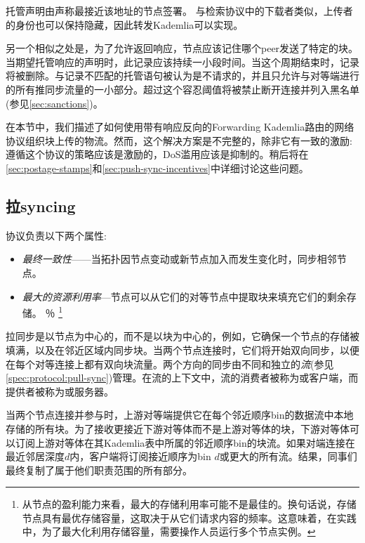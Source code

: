 托管声明由声称最接近该地址的节点签署。
与检索协议中的下载者类似，上传者的身份也可以保持隐藏，因此转发Kademlia可以实现。

另一个相似之处是，为了允许返回响应，节点应该记住哪个peer发送了特定的块。当期望托管响应的声明时，此记录应该持续一小段时间。当这个周期结束时，记录将被删除。与记录不匹配的托管语句被认为是不请求的，并且只允许与对等端进行的所有推同步流量的一小部分。超过这个容忍阈值将被禁止断开连接并列入黑名单(参见\ref{sec:sanctions})。

在本节中，我们描述了如何使用带有响应反向的Forwarding Kademlia路由的网络协议组织块上传的物流。然而，这个解决方案是不完整的，除非它有一致的激励:遵循这个协议的策略应该是激励的，DoS滥用应该是抑制的。稍后将在\ref{sec:postage-stamps}和\ref{sec:push-sync-incentives}中详细讨论这些问题。

\subsection{拉syncing\statusgreen}\label{sec:pull-syncing}

协议负责以下两个属性: 

\begin{itemize}
    \item \emph{最终一致性}——当拓扑因节点变动或新节点加入而发生变化时，同步相邻节点。
    \item \emph{最大的资源利用率}—节点可以从它们的对等节点中提取块来填充它们的剩余存储。%
％
\footnote{从节点的盈利能力来看，最大的存储利用率可能不是最佳的。换句话说，存储节点具有最优存储容量，这取决于从它们请求内容的频率。这意味着，在实践中，为了最大化利用存储容量，需要操作人员运行多个节点实例。}
\end{itemize}

拉同步是以节点为中心的，而不是以块为中心的，例如，它确保一个节点的存储被填满，以及在邻近区域内同步块。当两个节点连接时，它们将开始双向同步，以便在每个对等连接上都有双向块流量。两个方向的同步由不同和独立的\emph{流}(参见\ref{spec:protocol:pull-sync})管理。在流的上下文中，流的消费者被称为或客户端，而提供者被称为或服务器。

当两个节点连接并参与时，上游对等端提供它在每个邻近顺序bin的数据流中本地存储的所有块。为了接收更接近下游对等体而不是上游对等体的块，下游对等体可以订阅上游对等体在其Kademlia表中所属的邻近顺序bin的块流。如果对端连接在最近邻居深度$d$内，客户端将订阅接近顺序为bin $d$或更大的所有流。结果，同事们最终复制了属于他们职责范围的所有部分。

